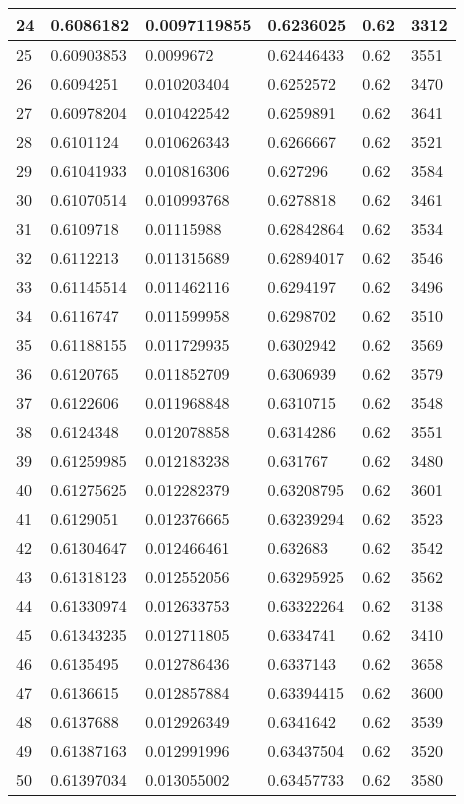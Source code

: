 \begin{longtable}{|l|l|l|l|l|l|}
24 & 0.6086182 & 0.0097119855 & 0.6236025 & 0.62 & 3312 \\ \hline 
25 & 0.60903853 & 0.0099672 & 0.62446433 & 0.62 & 3551 \\ \hline 
26 & 0.6094251 & 0.010203404 & 0.6252572 & 0.62 & 3470 \\ \hline 
27 & 0.60978204 & 0.010422542 & 0.6259891 & 0.62 & 3641 \\ \hline 
28 & 0.6101124 & 0.010626343 & 0.6266667 & 0.62 & 3521 \\ \hline 
29 & 0.61041933 & 0.010816306 & 0.627296 & 0.62 & 3584 \\ \hline 
30 & 0.61070514 & 0.010993768 & 0.6278818 & 0.62 & 3461 \\ \hline 
31 & 0.6109718 & 0.01115988 & 0.62842864 & 0.62 & 3534 \\ \hline 
32 & 0.6112213 & 0.011315689 & 0.62894017 & 0.62 & 3546 \\ \hline 
33 & 0.61145514 & 0.011462116 & 0.6294197 & 0.62 & 3496 \\ \hline 
34 & 0.6116747 & 0.011599958 & 0.6298702 & 0.62 & 3510 \\ \hline 
35 & 0.61188155 & 0.011729935 & 0.6302942 & 0.62 & 3569 \\ \hline 
36 & 0.6120765 & 0.011852709 & 0.6306939 & 0.62 & 3579 \\ \hline 
37 & 0.6122606 & 0.011968848 & 0.6310715 & 0.62 & 3548 \\ \hline 
38 & 0.6124348 & 0.012078858 & 0.6314286 & 0.62 & 3551 \\ \hline 
39 & 0.61259985 & 0.012183238 & 0.631767 & 0.62 & 3480 \\ \hline 
40 & 0.61275625 & 0.012282379 & 0.63208795 & 0.62 & 3601 \\ \hline 
41 & 0.6129051 & 0.012376665 & 0.63239294 & 0.62 & 3523 \\ \hline 
42 & 0.61304647 & 0.012466461 & 0.632683 & 0.62 & 3542 \\ \hline 
43 & 0.61318123 & 0.012552056 & 0.63295925 & 0.62 & 3562 \\ \hline 
44 & 0.61330974 & 0.012633753 & 0.63322264 & 0.62 & 3138 \\ \hline 
45 & 0.61343235 & 0.012711805 & 0.6334741 & 0.62 & 3410 \\ \hline 
46 & 0.6135495 & 0.012786436 & 0.6337143 & 0.62 & 3658 \\ \hline 
47 & 0.6136615 & 0.012857884 & 0.63394415 & 0.62 & 3600 \\ \hline 
48 & 0.6137688 & 0.012926349 & 0.6341642 & 0.62 & 3539 \\ \hline 
49 & 0.61387163 & 0.012991996 & 0.63437504 & 0.62 & 3520 \\ \hline 
50 & 0.61397034 & 0.013055002 & 0.63457733 & 0.62 & 3580 \\ \hline 
\end{longtable}